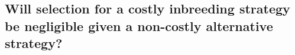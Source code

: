 \documentclass[10pt,letterpaper]{article}
\begin{document}
\subsection*{Will selection for a costly inbreeding strategy be negligible given a non-costly alternative strategy?}

\end{document}
